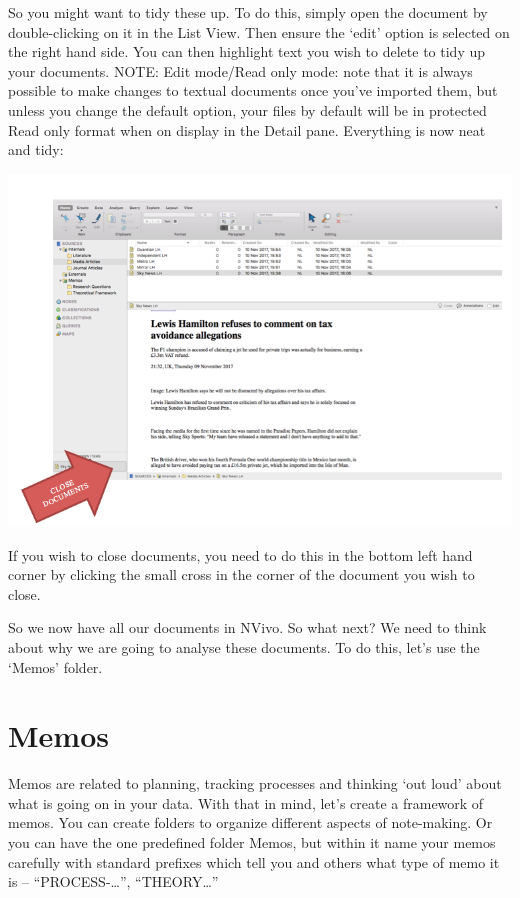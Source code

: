 \documentclass[]{book}
\theoremstyle{definition}
\theoremstyle{definition}
\theoremstyle{definition}
\theoremstyle{remark}
\begin{document}
So you might want to tidy these up. To do this, simply open the document
by double-clicking on it in the List View. Then ensure the `edit' option
is selected on the right hand side. You can then highlight text you wish
to delete to tidy up your documents. NOTE: Edit mode/Read only mode:
note that it is always possible to make changes to textual documents
once you've imported them, but unless you change the default option,
your files by default will be in protected Read only format when on
display in the Detail pane. Everything is now neat and tidy:

\includegraphics{imgs/qual_17.png}

If you wish to close documents, you need to do this in the bottom left
hand corner by clicking the small cross in the corner of the document
you wish to close.

So we now have all our documents in NVivo. So what next? We need to
think about why we are going to analyse these documents. To do this,
let's use the `Memos' folder.

\hypertarget{memos-1}{%
\section{Memos}\label{memos-1}}

Memos are related to planning, tracking processes and thinking `out
loud' about what is going on in your data. With that in mind, let's
create a framework of memos. You can create folders to organize
different aspects of note-making. Or you can have the one predefined
folder Memos, but within it name your memos carefully with standard
prefixes which tell you and others what type of memo it is --
``PROCESS-\ldots{}'', ``THEORY\ldots{}''
\end{document}
